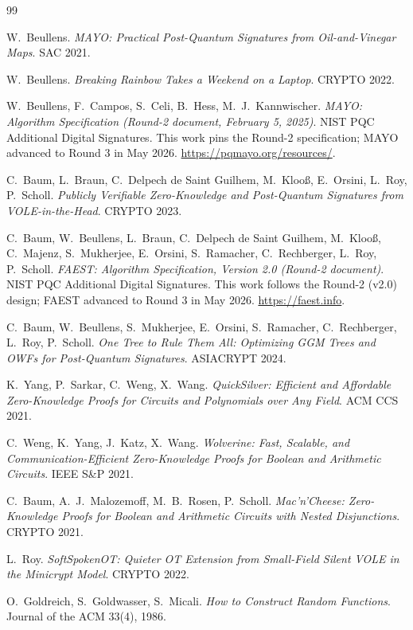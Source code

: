 \documentclass[11pt]{article}
\begin{document}
\begin{thebibliography}{99}\small

W.~Beullens.
\emph{MAYO: Practical Post-Quantum Signatures from Oil-and-Vinegar Maps}.
SAC 2021.

W.~Beullens.
\emph{Breaking Rainbow Takes a Weekend on a Laptop}.
CRYPTO 2022.

W.~Beullens, F.~Campos, S.~Celi, B.~Hess, M.~J.~Kannwischer.
\emph{MAYO: Algorithm Specification (Round-2 document, February 5, 2025)}.
NIST PQC Additional Digital Signatures. This work pins the Round-2
specification; MAYO advanced to Round 3 in May 2026.
\url{https://pqmayo.org/resources/}.

C.~Baum, L.~Braun, C.~Delpech de Saint Guilhem, M.~Kloo{\ss}, E.~Orsini,
L.~Roy, P.~Scholl.
\emph{Publicly Verifiable Zero-Knowledge and Post-Quantum Signatures from
VOLE-in-the-Head}.
CRYPTO 2023.

C.~Baum, W.~Beullens, L.~Braun, C.~Delpech de Saint Guilhem, M.~Kloo{\ss},
C.~Majenz, S.~Mukherjee, E.~Orsini, S.~Ramacher, C.~Rechberger, L.~Roy,
P.~Scholl.
\emph{FAEST: Algorithm Specification, Version 2.0 (Round-2 document)}.
NIST PQC Additional Digital Signatures. This work follows the Round-2
(v2.0) design; FAEST advanced to Round 3 in May 2026.
\url{https://faest.info}.

C.~Baum, W.~Beullens, S.~Mukherjee, E.~Orsini, S.~Ramacher, C.~Rechberger,
L.~Roy, P.~Scholl.
\emph{One Tree to Rule Them All: Optimizing GGM Trees and OWFs for
Post-Quantum Signatures}.
ASIACRYPT 2024.

K.~Yang, P.~Sarkar, C.~Weng, X.~Wang.
\emph{QuickSilver: Efficient and Affordable Zero-Knowledge Proofs for
Circuits and Polynomials over Any Field}.
ACM CCS 2021.

C.~Weng, K.~Yang, J.~Katz, X.~Wang.
\emph{Wolverine: Fast, Scalable, and Communication-Efficient Zero-Knowledge
Proofs for Boolean and Arithmetic Circuits}.
IEEE S\&P 2021.

C.~Baum, A.~J.~Malozemoff, M.~B.~Rosen, P.~Scholl.
\emph{Mac'n'Cheese: Zero-Knowledge Proofs for Boolean and Arithmetic
Circuits with Nested Disjunctions}.
CRYPTO 2021.

L.~Roy.
\emph{SoftSpokenOT: Quieter OT Extension from Small-Field Silent VOLE in the
Minicrypt Model}.
CRYPTO 2022.

O.~Goldreich, S.~Goldwasser, S.~Micali.
\emph{How to Construct Random Functions}.
Journal of the ACM 33(4), 1986.


\end{thebibliography}
\end{document}
